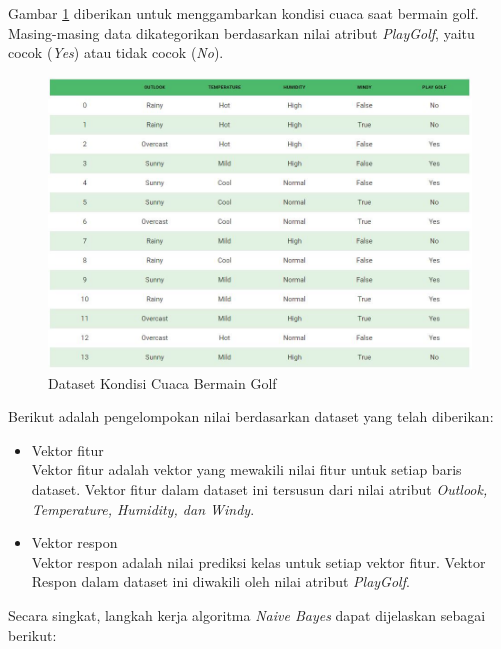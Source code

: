 \documentclass[a4paper,twoside]{article}
\begin{document}
\begin{enumerate}
\vspace{0.3cm}

\noindent Gambar \ref{fig:naive_bayes1} diberikan untuk menggambarkan kondisi cuaca saat bermain golf. Masing-masing data dikategorikan berdasarkan nilai atribut \textit{PlayGolf}, yaitu cocok (\textit{Yes}) atau tidak cocok (\textit{No}). 

\begin{figure}[H]
	\centering
	\includegraphics[scale=0.75]{naive_bayes1}
	\caption{Dataset Kondisi Cuaca Bermain Golf}
	\label{fig:naive_bayes1}
\end{figure}

\noindent Berikut adalah pengelompokan nilai berdasarkan dataset yang telah diberikan:

\begin{itemize}

\item 
Vektor fitur\\
Vektor fitur adalah vektor yang mewakili nilai fitur untuk setiap baris dataset. Vektor fitur dalam dataset ini tersusun dari nilai atribut \textit{Outlook, Temperature, Humidity, dan Windy}.

\item
Vektor respon\\
Vektor respon adalah nilai prediksi kelas untuk setiap vektor fitur. Vektor Respon dalam dataset ini diwakili oleh nilai atribut \textit{PlayGolf}.

\end{itemize}


\noindent Secara singkat, langkah kerja algoritma \textit{Naive Bayes} dapat dijelaskan sebagai berikut:


\end{enumerate}
\end{document}
